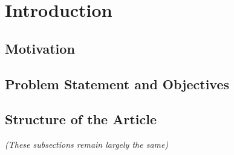 \section{Introduction}
\label{sec:introduction}
\subsection{Motivation}
\subsection{Problem Statement and Objectives}
\subsection{Structure of the Article}
\textit{(These subsections remain largely the same)}